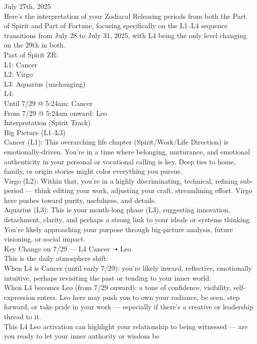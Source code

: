 \documentclass{article}
\begin{document}
July 27th, 2025\\
Here's the interpretation of your Zodiacal Releasing periods from both
the Part of Spirit and Part of Fortune, focusing specifically on the
L1--L4 sequence transitions from July 28 to July 31, 2025, with L4 being
the only level changing on the 29th in both.\\
 Part of Spirit ZR:\\
L1: Cancer\\
L2: Virgo\\
L3: Aquarius (unchanging)\\
L4:\\
Until 7/29 @ 5:24am: Cancer\\
From 7/29 @ 5:24am onward: Leo\\
 Interpretation (Spirit Track)\\
Big Picture (L1--L3)\\
Cancer (L1): This overarching life chapter (Spirit/Work/Life Direction)
is emotionally-driven. You're in a time where belonging, nurturance, and
emotional authenticity in your personal or vocational calling is key.
Deep ties to home, family, or origin stories might color everything you
pursue.\\
Virgo (L2): Within that, you're in a highly discriminating, technical,
refining sub-period --- think editing your work, adjusting your craft,
streamlining effort. Virgo here pushes toward purity, usefulness, and
details.\\
Aquarius (L3): This is your month-long phase (L3), suggesting
innovation, detachment, clarity, and perhaps a strong link to your
ideals or systems thinking. You're likely approaching your purpose
through big-picture analysis, future visioning, or social impact.\\
Key Change on 7/29 --- L4 Cancer ➝ Leo\\
This is the daily atmosphere shift:\\
When L4 is Cancer (until early 7/29): you're likely inward, reflective,
emotionally intuitive, perhaps revisiting the past or tending to your
inner world.\\
When L4 becomes Leo (from 7/29 onward): a tone of confidence,
visibility, self-expression enters. Leo here may push you to own your
radiance, be seen, step forward, or take pride in your work ---
especially if there's a creative or leadership thread to it.\\
This L4 Leo activation can highlight your relationship to being
witnessed --- are you ready to let your inner authority or wisdom be
\end{document}
